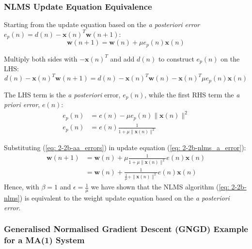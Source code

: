 \documentclass[12pt]{article}
\numberwithin{equation}{section}
\def\vw{{\bm{w}}}
\begin{document}
		\subsubsection{NLMS Update Equation Equivalence}
			Starting from the update equation based on the \textit{a posteriori error} $e_{p}(n) = d(n) - \mathbf{x}(n)^{T} \vw(n + 1)$:
			\begin{equation}
			\vw(n + 1) = \vw(n) + \mu e_{p}(n) \mathbf{x}(n)
			\end{equation}
			
			Multiply both sides with $-\mathbf{x}(n)^{T}$ and add $d(n)$ to construct $e_{p}(n)$ on the LHS:
			\begin{equation}
			d(n) - \mathbf{x}(n)^{T} \vw(n + 1) = d(n) - \mathbf{x}(n)^{T} \vw(n) - \mathbf{x}(n)^{T} \mu e_{p}(n) \mathbf{x}(n)
			\end{equation}
			
			The LHS term is the \textit{a posteriori} error, $e_{p}(n)$, while the first RHS term the \textit{a priori error}, $e(n)$:
			\begin{align}
			e_{p}(n)    &= e(n) - \mu e_{p}(n) \| \mathbf{x}(n) \|^{2} \\
			e_{p}(n)    &= e(n) \frac{1}{1 + \mu \| \mathbf{x}(n) \|^{2}}
			\label{eq: 2-2b-aa_errors}
			\end{align}
			
			Substituting (\ref{eq: 2-2b-aa_errors}) in update equation (\ref{eq: 2-2b-nlms_a_error}):
			\begin{align}
			\vw(n + 1)  &= \vw(n) + \mu \frac{1}{1 + \mu \| \mathbf{x}(n) \|^{2}} e(n) \mathbf{x}(n) \\
			  &= \vw(n) + \frac{1}{\frac{1}{\mu} + \| \mathbf{x}(n) \|^{2}} e(n) \mathbf{x}(n) \label{eq: 2-2b-nlms}
			\end{align}
			\noindent
			Hence, with $\beta = 1$ and $\epsilon = \frac{1}{\mu}$ we have shown that the NLMS algorithm (\ref{eq: 2-2b-nlms}) is equivalent to the weight update equation based on the \textit{a posteriori error}.
		
		\subsubsection{Generalised Normalised Gradient Descent (GNGD) Example for a MA(1) System} 
		
\end{document}
